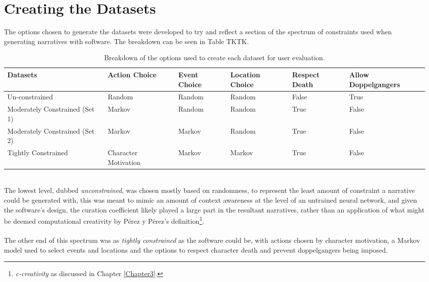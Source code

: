 \documentclass[letterpaper]{article}
\begin{document}
\section{Creating the Datasets}
The options chosen to generate the datasets were developed to try and reflect a section of the spectrum of constraints used when generating narratives with software. The breakdown can be seen in Table TKTK.\\ 
\begin{table}[h!]
\caption[Breakdown of Datasets]{Breakdown of the options used to create each dataset for user evaluation.}
\label{table:datasets}
\centering
\begin{tabu} {X[c] | X[c] X[c] X[c] X[c] X[c]}
\toprule
Datasets & Action Choice & Event Choice & Location Choice & Respect Death & Allow Doppelgangers \\
\midrule
Un-\newline constrained & Random & Random & Random & False & True\\ \midrule
Moderately Constrained (Set 1) & Markov & Random & Random & True & False\\ \midrule
Moderately Constrained (Set 2) & Markov & Markov & Random & True & False\\ \midrule
Tightly Constrained & Character Motivation & Markov & Markov & True & False\\
\bottomrule
\end{tabu}
\end{table}
\\The lowest level, dubbed \emph{unconstrained}, was chosen mostly based on randomness, to represent the least amount of constraint a narrative could be generated with, this was meant to mimic an amount of context awareness at the level of an untrained neural network, and given the software's design, the curation coefficient likely played a large part in the resultant narratives, rather than an application of what might be deemed computational creativity by P\'erez y P\'erez's definition\footnote{\emph{c-creativity} as discussed in Chapter \ref{Chapter3}.}.\\
\\The other end of this spectrum was as \emph{tightly constrained} as the software could be, with actions chosen by character motivation, a Markov model used to select events and locations and the options to respect character death and prevent doppelgangers being imposed.\\ 
\end{document}
